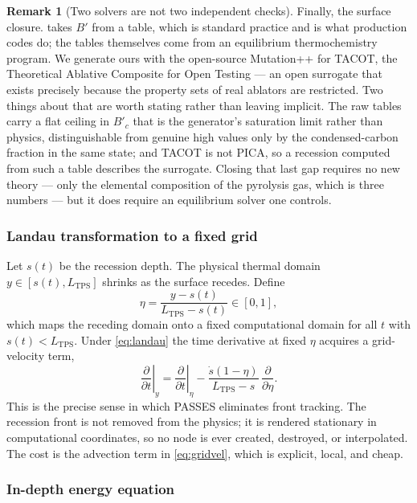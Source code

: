 \documentclass[11pt,a4paper]{article}
\theoremstyle{definition}
\newtheorem{remark}[theorem]{Remark}
\numberwithin{equation}{section}
\begin{document}
\begin{remark}[Two solvers are not two independent checks]
Finally, the surface closure.  takes $B'$ from a table, which is standard practice and is what production codes do; the tables themselves come from an equilibrium thermochemistry program. We generate ours with the open-source Mutation++ \cite{scoggins2020} for TACOT, the Theoretical Ablative Composite for Open Testing --- an open surrogate that exists precisely because the property sets of real ablators are restricted. Two things about that are worth stating rather than leaving implicit. The raw tables carry a flat ceiling in $B'_c$ that is the generator's saturation limit rather than physics, distinguishable from genuine high values only by the condensed-carbon fraction in the same state; and TACOT is not PICA, so a recession computed from such a table describes the surrogate. Closing that last gap requires no new theory --- only the elemental composition of the pyrolysis gas, which is three numbers --- but it does require an equilibrium solver one controls.
\end{remark}

\subsubsection{Landau transformation to a fixed grid}

Let $s(t)$ be the recession depth. The physical thermal domain $y \in [s(t), L_{\text{TPS}}]$ shrinks as the surface recedes. Define
\begin{equation}
\label{eq:landau}
\eta = \frac{y - s(t)}{L_{\text{TPS}} - s(t)} \in [0,1],
\end{equation}
which maps the receding domain onto a fixed computational domain for all $t$ with $s(t) < L_{\text{TPS}}$. Under \cref{eq:landau} the time derivative at fixed $\eta$ acquires a grid-velocity term,
\begin{equation}
\label{eq:gridvel}
\left.\frac{\partial}{\partial t}\right|_{y}
= \left.\frac{\partial}{\partial t}\right|_{\eta}
- \frac{\dot{s}(1-\eta)}{L_{\text{TPS}} - s}\, \frac{\partial}{\partial \eta}.
\end{equation}
This is the precise sense in which PASSES eliminates front tracking. The recession front is not removed from the physics; it is rendered stationary in computational coordinates, so no node is ever created, destroyed, or interpolated. The cost is the advection term in \cref{eq:gridvel}, which is explicit, local, and cheap.

\subsubsection{In-depth energy equation}
\end{document}
